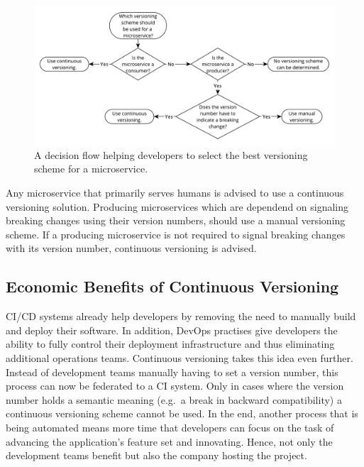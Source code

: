 \begin{figure}[H]
\begin{center}
  \includegraphics[scale=0.55]{images/figures/versioning_decision_flow.pdf}
\end{center}
\caption{A decision flow helping developers to select the best versioning
  scheme for a microservice.}%
\label{fig:versioning_decision_flow}
\end{figure}

Any microservice that primarily serves humans is advised to use a continuous
versioning solution. Producing microservices which are dependend on signaling
breaking changes using their version numbers, should use a manual versioning
scheme. If a producing microservice is not required to signal breaking changes
with its version number, continuous versioning is advised.

\subsection{Economic Benefits of Continuous Versioning}%
\label{sub:Economic_Benefits_of_Continuous_Versioning}
\ac{CI}/\ac{CD} systems already help developers by removing the need to
manually build and deploy their software. In addition, DevOps practises give
developers the ability to fully control their deployment infrastructure and
thus eliminating additional operations teams. Continuous versioning takes this
idea even further. Instead of development teams manually having to set a
version number, this process can now be federated to a \ac{CI} system. Only in
cases where the version number holds a semantic meaning (e.g.\ a break in
backward compatibility) a continuous versioning scheme cannot be used. In the
end, another process that is being automated means more time that developers can
focus on the task of advancing the application's feature set and innovating.
Hence, not only the development teams benefit but also the company hosting the
project.

